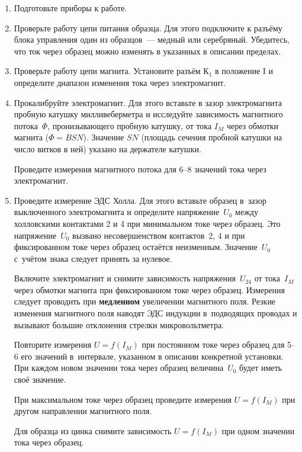 \begin{enumerate}

\item{Подготовьте приборы к работе.}

\item{ Проверьте работу цепи питания образца. Для этого подключите к разъёму блока управления один из образцов~--- медный или серебряный. Убедитесь, что ток через образец можно изменять в указанных в описании пределах.}
\item{ Проверьте работу цепи магнита. Установите разъём К$_1$ в положение I и определите диапазон изменения тока через электромагнит.}
\item{ Прокалибруйте электромагнит. Для этого вставьте в зазор электромагнита пробную катушку милливеберметра и исследуйте зависимость магнитного потока~$\Phi$, пронизывающего пробную катушку, от тока $I_M$ через обмотки магнита ($\Phi=BSN$).
Значение $SN$ (площадь сечения пробной катушки на число витков в ней) указано на держателе катушки.

Проведите измерения магнитного потока для 6--8 значений тока через электромагнит.}

\item{ Проведите измерение ЭДС Холла. Для этого вставьте образец в~зазор выключенного электромагнита и определите напряжение~$U_0$ между холловскими контактами 2 и 4 при минимальном токе через образец. Это напряжение~$U_0$ вызвано несовершенством контактов~2, 4 и при фиксированном токе через образец остаётся неизменным. Значение~$U_0$ с~учётом знака следует принять за нулевое.

Включите электромагнит и снимите зависимость напряжения~$U_{24}$ от тока~$I_M$ через обмотки магнита при фиксированном токе через образец. Измерения следует проводить при {\bf медленном} увеличении магнитного поля. Резкие изменения магнитного поля наводят ЭДС индукции в~подводящих проводах и вызывают большие отклонения стрелки микровольтметра.

Повторите измерения $U=f(I_{M})$ при постоянном токе через образец для 5--6 его значений в~интервале, указанном в описании конкретной установки. При каждом новом значении тока через образец величина~$U_0$ будет иметь своё значение.

При максимальном токе через образец проведите измерения $U=f(I_{M})$ при другом направлении магнитного поля.

Для образца из цинка снимите зависимость $U=f(I_{M})$ при одном значении тока через образец.}


\end{enumerate}

